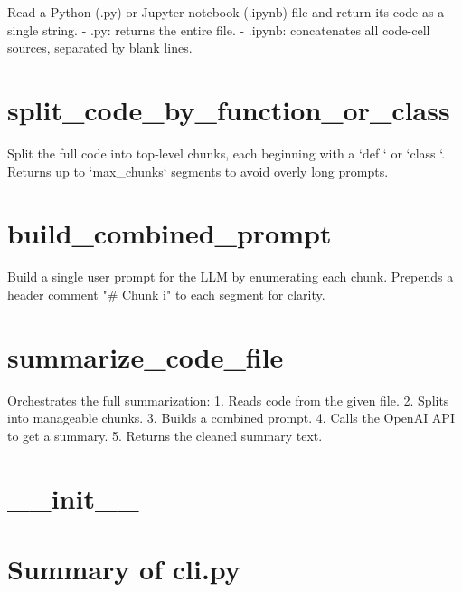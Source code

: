 \documentclass{article}
\begin{document}
Read a Python (.py) or Jupyter notebook (.ipynb) file and return its code as a single string.
- .py: returns the entire file.
- .ipynb: concatenates all code-cell sources, separated by blank lines.







\section{split_code_by_function_or_class}


Split the full code into top‑level chunks, each beginning with a `def ` or `class `.
Returns up to `max_chunks` segments to avoid overly long prompts.







\section{build_combined_prompt}


Build a single user prompt for the LLM by enumerating each chunk.
Prepends a header comment "# Chunk i" to each segment for clarity.







\section{summarize_code_file}


Orchestrates the full summarization:
  1. Reads code from the given file.
  2. Splits into manageable chunks.
  3. Builds a combined prompt.
  4. Calls the OpenAI API to get a summary.
  5. Returns the cleaned summary text.







\section{__init__}








\section{Summary of cli.py}
\end{document}
